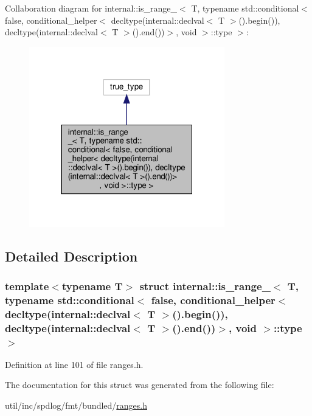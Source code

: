 Collaboration diagram for internal\+:\+:is\+\_\+range\+\_\+$<$ T, typename std\+:\+:conditional$<$ false, conditional\+\_\+helper$<$ decltype(internal\+:\+:declval$<$ T $>$().begin()), decltype(internal\+:\+:declval$<$ T $>$().end())$>$, void $>$\+:\+:type $>$\+:
\nopagebreak
\begin{figure}[H]
\begin{center}
\leavevmode
\includegraphics[width=241pt]{structinternal_1_1is__range___3_01_t_00_01typename_01std_1_1conditional_3_01false_00_01condition64c7f277cd18fe294676781c43a702bd}
\end{center}
\end{figure}


\subsection{Detailed Description}
\subsubsection*{template$<$typename T$>$\newline
struct internal\+::is\+\_\+range\+\_\+$<$ T, typename std\+::conditional$<$ false, conditional\+\_\+helper$<$ decltype(internal\+::declval$<$ T $>$().\+begin()), decltype(internal\+::declval$<$ T $>$().\+end())$>$, void $>$\+::type $>$}



Definition at line 101 of file ranges.\+h.



The documentation for this struct was generated from the following file\+:\begin{DoxyCompactItemize}
\item 
util/inc/spdlog/fmt/bundled/\hyperlink{ranges_8h}{ranges.\+h}\end{DoxyCompactItemize}

